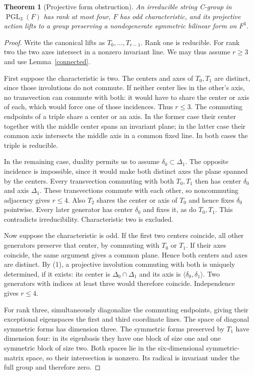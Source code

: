 \documentclass[11pt,a4paper]{article}
\newtheorem{theorem}{Theorem}\newtheorem{lemma}[theorem]{Lemma}\newtheorem{proposition}[theorem]{Proposition}
\newcommand{\gen}[1]{\langle #1\rangle}\newcommand{\im}{\operatorname{im}}\newcommand{\GL}{\operatorname{GL}}\newcommand{\PGL}{\operatorname{PGL}}
\begin{document}
\begin{theorem}[Projective form obstruction]\label{three}
An irreducible string C-group in $\PGL_3(F)$ has rank at most four,
$F$ has odd characteristic, and its projective action lifts to a group
preserving a nondegenerate symmetric bilinear form on $F^3$.
\end{theorem}
\begin{proof}
Write the canonical lifts as $T_0,\ldots,T_{r-1}$. Rank one is reducible.
For rank two the two axes intersect in a nonzero invariant line. We may thus
assume $r\ge3$ and use Lemma~\ref{connected}.

First suppose the characteristic is two. The centers and axes of $T_0,T_1$
are distinct, since those involutions do not commute. If neither center lies
in the other's axis, no transvection can commute with both: it would have
to share the center or axis of each, which would force one of those
incidences. Thus $r\le3$. The commuting endpoints of a triple share a center
or an axis. In the former case their center together with the middle center
spans an invariant plane; in the latter case their common axis intersects
the middle axis in a common fixed line. In both cases the triple is reducible.

In the remaining case, duality permits us to assume
$\delta_0\subset\Delta_1$. The opposite incidence is impossible, since it
would make both distinct axes the plane spanned by the centers.
Every transvection commuting with both $T_0,T_1$ then has center
$\delta_0$ and axis $\Delta_1$. These transvections commute with each other,
so noncommuting adjacency gives $r\le4$. Also $T_2$ shares the center or
axis of $T_0$ and hence fixes $\delta_0$ pointwise. Every later generator
has center $\delta_0$ and fixes it, as do $T_0,T_1$. This contradicts
irreducibility. Characteristic two is excluded.

Now suppose the characteristic is odd. If the first two centers coincide,
all other generators preserve that center, by commuting with $T_0$ or $T_1$.
If their axes coincide, the same argument gives a common plane. Hence both
centers and axes are distinct. By (1), a projective involution commuting
with both is uniquely determined, if it exists: its center is
$\Delta_0\cap\Delta_1$ and its axis is $\gen{\delta_0,\delta_1}$.
Two generators with indices at least three would therefore coincide. Independence gives
$r\le4$.

For rank three, simultaneously diagonalize the commuting endpoints, giving
their exceptional eigenspaces the first and third coordinate lines.
The space of diagonal symmetric forms has dimension three. The symmetric
forms preserved by $T_1$ have dimension four: in its eigenbasis they have
one block of size one and one symmetric block of size two. Both spaces lie
in the six-dimensional symmetric-matrix space, so their intersection is
nonzero. Its radical is invariant under the full group and therefore zero.


\end{proof}
\end{document}
